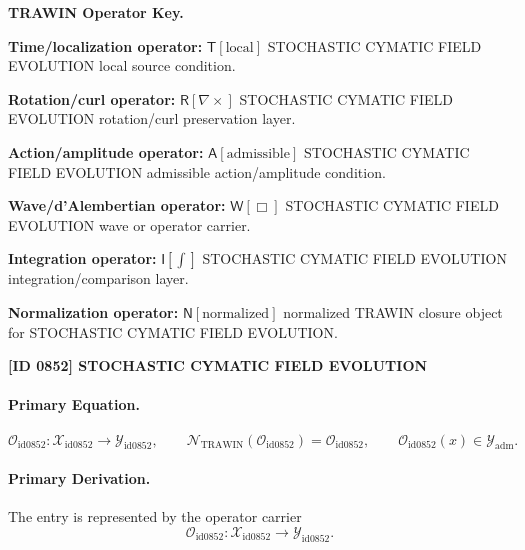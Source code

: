 \par\vspace{0.45\baselineskip}
\noindent\begin{minipage}[t]{\linewidth}
\begingroup
\small
\raggedright
\textbf{TRAWIN Operator Key.}\par
\noindent\textbf{Time/localization operator:} $\mathsf{T}\!\left[\mathrm{local}\right]$ STOCHASTIC CYMATIC FIELD EVOLUTION local source condition.\par
\noindent\textbf{Rotation/curl operator:} $\mathsf{R}\!\left[\nabla\times\right]$ STOCHASTIC CYMATIC FIELD EVOLUTION rotation/curl preservation layer.\par
\noindent\textbf{Action/amplitude operator:} $\mathsf{A}\!\left[\mathrm{admissible}\right]$ STOCHASTIC CYMATIC FIELD EVOLUTION admissible action/amplitude condition.\par
\noindent\textbf{Wave/d'Alembertian operator:} $\mathsf{W}\!\left[\Box\right]$ STOCHASTIC CYMATIC FIELD EVOLUTION wave or operator carrier.\par
\noindent\textbf{Integration operator:} $\mathsf{I}\!\left[\int\right]$ STOCHASTIC CYMATIC FIELD EVOLUTION integration/comparison layer.\par
\noindent\textbf{Normalization operator:} $\mathsf{N}\!\left[\mathrm{normalized}\right]$ normalized TRAWIN closure object for STOCHASTIC CYMATIC FIELD EVOLUTION.\par
\endgroup
\end{minipage}

\clearpage
\noindent\textbf{[ID 0852] STOCHASTIC CYMATIC FIELD EVOLUTION}\par
\vspace{0.35em}
\paragraph{Primary Equation.}
\[
\mathcal{O}_{\mathrm{id0852}}:\mathcal{X}_{\mathrm{id0852}}\longrightarrow \mathcal{Y}_{\mathrm{id0852}},\qquad
\mathcal{N}_{\mathrm{TRAWIN}}(\mathcal{O}_{\mathrm{id0852}})=\mathcal{O}_{\mathrm{id0852}},\qquad
\mathcal{O}_{\mathrm{id0852}}(x)\in\mathcal{Y}_{\mathrm{adm}}.
\]

\paragraph{Primary Derivation.} The entry is represented by the operator carrier\[
\mathcal{O}_{\mathrm{id0852}}:\mathcal{X}_{\mathrm{id0852}}\longrightarrow \mathcal{Y}_{\mathrm{id0852}}.
\]


